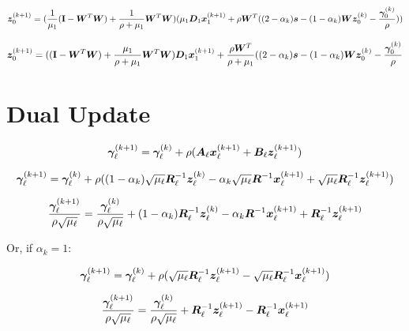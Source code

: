 \begin{equation}
\bm{z}_0^{(k + 1)} = (\frac{1}{\mu_1}({\bf I} - \bm{W}^T\bm{W}) + \frac{1}{\rho + \mu_1}\bm{W}^T\bm{W})(\mu_1\bm{D}_1\bm{x}_1^{(k + 1)} + \rho\bm{W}^T((2 - \alpha_k)\bm{s} - (1 - \alpha_k)\bm{W}\bm{z}_0^{(k)} - \frac{\bm{\gamma}_0^{(k)}}{\rho}))
\end{equation}

\begin{equation}
\bm{z}_0^{(k + 1)} = (({\bf I} - \bm{W}^T\bm{W}) + \frac{\mu_1}{\rho + \mu_1}\bm{W}^T\bm{W})\bm{D}_1\bm{x}_1^{(k + 1)} + \frac{\rho\bm{W}^T}{\rho + \mu_1}((2 - \alpha_k)\bm{s} - (1 - \alpha_k)\bm{W}\bm{z}_0^{(k)} - \frac{\bm{\gamma}_0^{(k)}}{\rho}
\end{equation}

\section{Dual Update}

\begin{equation}
\bm{\gamma}_{\ell}^{(k + 1)} = \bm{\gamma}_{\ell}^{(k)} + \rho(\bm{A}_{\ell}\bm{x}_{\ell}^{(k + 1)} + \bm{B}_{\ell}\bm{z}_{\ell}^{(k + 1)})
\end{equation}

\begin{equation}
\bm{\gamma}_{\ell}^{(k + 1)} = \bm{\gamma}_{\ell}^{(k)} + \rho((1 - \alpha_k)\sqrt{\mu_{\ell}}\bm{R}_{\ell}^{-1}\bm{z}_{\ell}^{(k)} - \alpha_k\sqrt{\mu_{\ell}}\bm{R}^{-1}\bm{x}_{\ell}^{(k + 1)} + \sqrt{\mu_{\ell}}\bm{R}_{\ell}^{-1}\bm{z}_{\ell}^{(k + 1)})
\end{equation}

\begin{equation}
\frac{\bm{\gamma}_{\ell}^{(k + 1)}}{\rho\sqrt{\mu_{\ell}}} = \frac{\bm{\gamma}_{\ell}^{(k)}}{\rho\sqrt{\mu_{\ell}}} + (1 - \alpha_k)\bm{R}_{\ell}^{-1}\bm{z}_{\ell}^{(k)} - \alpha_k\bm{R}^{-1}\bm{x}_{\ell}^{(k + 1)} + \bm{R}_{\ell}^{-1}\bm{z}_{\ell}^{(k + 1)}
\end{equation}

Or, if $\alpha_k = 1$:

\begin{equation}
\bm{\gamma}_{\ell}^{(k + 1)} = \bm{\gamma}_{\ell}^{(k)} + \rho(\sqrt{\mu_{\ell}}\bm{R}_{\ell}^{-1}\bm{z}_{\ell}^{(k + 1)} - \sqrt{\mu_{\ell}}\bm{R}_{\ell}^{-1}\bm{x}_{\ell}^{(k + 1)}) 
\end{equation}

\begin{equation}
\frac{\bm{\gamma}_{\ell}^{(k + 1)}}{\rho\sqrt{\mu_{\ell}}} = \frac{\bm{\gamma}_{\ell}^{(k)}}{\rho\sqrt{\mu_{\ell}}} + \bm{R}_{\ell}^{-1}\bm{z}_{\ell}^{(k + 1)} - \bm{R}_{\ell}^{-1}\bm{x}_{\ell}^{(k + 1)}
\end{equation}

